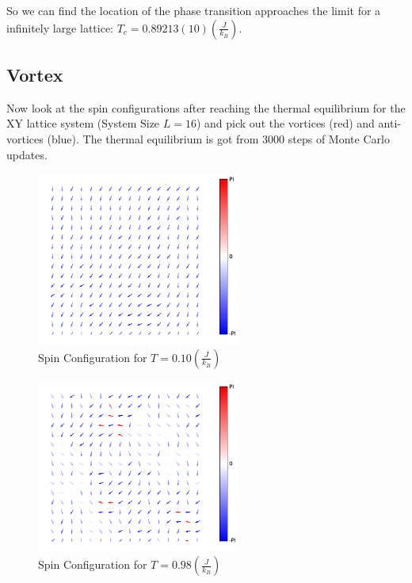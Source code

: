 \documentclass[a4paper]{article}
\begin{document}
So we can find the location of the phase transition approaches the limit for a infinitely large lattice: $T_c = 0.892 13(10) (\displaystyle \frac{J}{k_B})$\cite{olsson1995monte}. 

\subsection{Vortex}

Now look at the spin configurations after reaching the thermal equilibrium for the XY lattice system (System Size $L = 16$) and pick out the vortices (red) and anti-vortices (blue). The thermal equilibrium is got from $3000$ steps of Monte Carlo updates.

\begin{figure}[H]
\centering
\includegraphics[width = 0.6\textwidth]{../vortex/XY-T0100.pdf}
\caption{Spin Configuration for $T = 0.10 (\displaystyle \frac{J}{k_B})$}
\end{figure}

\begin{figure}[H]
\centering
\includegraphics[width = 0.6\textwidth]{../vortex/XY-T0984.pdf}
\caption{Spin Configuration for $T = 0.98 (\displaystyle \frac{J}{k_B})$}
\end{figure}
\end{document}
